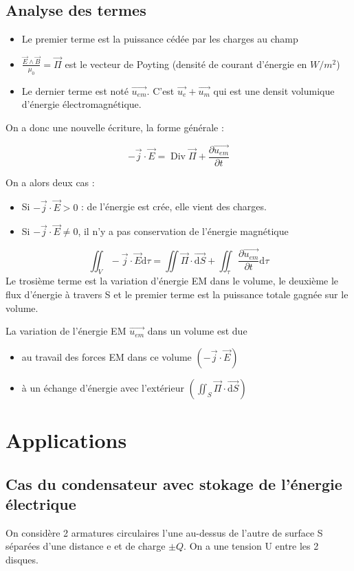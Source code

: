 \documentclass[french]{yLectureNote}
\renewcommand{\vec}{\overrightarrow}
\newcommand{\dd}{\mathrm{d}}
\DeclareMathOperator{\Div}{Div}
\begin{document}
\subsection{Analyse des termes}
\begin{itemize}
    \item Le premier terme est la puissance cédée par les charges au champ
    \item $\frac{\vec{E}\wedge \vec{B}}{\mu_0} = \vec{\Pi}$ est le vecteur de Poyting (densité de courant d'énergie en $W/m^2$)
    \item Le dernier terme est noté $\vec{u_{em}}$. C'est $\vec{u_e}+ \vec{u_m}$ qui est une densit volumique d'énergie électromagnétique.
\end{itemize}
On a donc une nouvelle écriture, la forme générale : 
\begin{theorem}
    $$-\vec{j}\cdot \vec{E} = \Div\vec{\Pi}+\frac{\partial \vec{u_{em}}}{\partial t}$$
\end{theorem}
On a alors deux cas : 
\begin{itemize}
    \item Si $-\vec{j}\cdot \vec{E}>0$ : de l'énergie est crée, elle vient des charges.
    \item Si $-\vec{j}\cdot \vec{E}\neq 0$, il n'y a pas conservation de l'énergie magnétique
\end{itemize}
\begin{theorem}
    $$\iint_V -\vec{j}\cdot \vec{E}\dd \tau = \iint \vec{\Pi}\cdot \vec{\dd S}+ \iint_\tau \frac{\partial \vec{u_{em}}}{\partial t}\dd \tau$$
    Le trosième terme est la variation d'énergie EM dans le volume, le deuxième le flux d'énergie à travers S et le premier terme est la puissance totale gagnée sur le volume.
\end{theorem}
La variation de l'énergie EM $\vec{u_{em}}$ dans un volume est due 
\begin{itemize}
    \item au travail des forces EM dans ce volume $(-\vec{j}\cdot \vec{E})$
    \item à un échange d'énergie avec l'extérieur $(\iint_S \vec{\Pi}\cdot \vec{\dd S})$
\end{itemize}
\section{Applications}
\subsection{Cas du condensateur avec stokage de l'énergie électrique}
On considère 2 armatures circulaires l'une au-dessus de l'autre de surface S séparées d'une distance e et de charge $\pm Q$.
On a une tension U entre les 2 disques.
\end{document}

